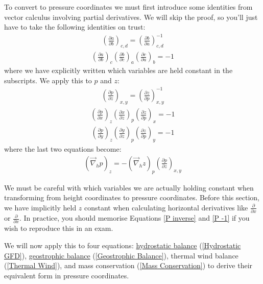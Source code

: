 To convert to pressure coordinates we must first introduce some identities from vector calculus involving partial derivatives. We will skip the proof, so you'll just have to take the following identities on trust:
\begin{align*}
    \left(\frac{\partial a}{\partial b}\right)_{c,d}=\left(\frac{\partial b}{\partial a}\right)_{c,d}^{-1}
\end{align*}
\begin{align*}
    \left(\frac{\partial a}{\partial b}\right)_c
    \left(\frac{\partial b}{\partial c}\right)_a
    \left(\frac{\partial c}{\partial a}\right)_b
    =-1
\end{align*}
where we have explicitly written which variables are held constant in the subscripts. We apply this to \(p\) and \(z\):
\begin{align}
    \label{P inverse}
    \left(\frac{\partial p}{\partial z}\right)_{x,y}=\left(\frac{\partial z}{\partial p}\right)_{x,y}^{-1}
\end{align}
\begin{align*}
    \left(\frac{\partial p}{\partial x}\right)_z
    \left(\frac{\partial x}{\partial z}\right)_p
    \left(\frac{\partial z}{\partial p}\right)_x
    =-1
\end{align*}
\begin{align*}
    \left(\frac{\partial p}{\partial y}\right)_z
    \left(\frac{\partial y}{\partial z}\right)_p
    \left(\frac{\partial z}{\partial p}\right)_y
    =-1
\end{align*}
where the last two equations become:
\begin{align}
    \label{P -1}
    \left(\vec{\nabla}_h p\right)_z=-\left(\vec{\nabla}_h z\right)_p\left(\frac{\partial p}{\partial z}\right)_{x,y}
\end{align}

We must be careful with which variables we are actually holding constant when transforming from height coordinates to pressure coordinates. Before this section, we have implicitly held \(z\) constant when calculating horizontal derivatives like \(\frac{\partial}{\partial x}\) or \(\frac{\partial}{\partial x}\). In practice, you should memorise Equations \ref{P inverse} and \ref{P -1} if you wish to reproduce this in an exam.

We will now apply this to four equations: \hyperref[Hydrostatic GFD Box]{hydrostatic balance} (\ref{Hydrostatic GFD}), \hyperref[Geostrophic Box]{geostrophic balance} (\ref{Geostrophic Balance}), thermal wind balance (\ref{Thermal Wind}), and mass conservation (\ref{Mass Conservation}) to derive their equivalent form in pressure coordinates. 


